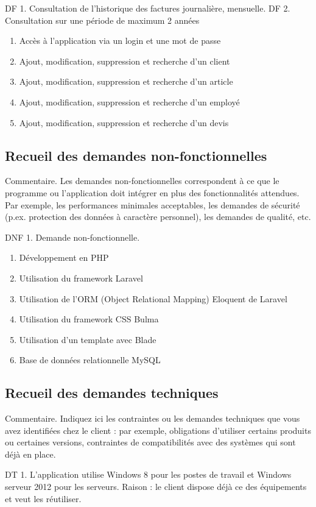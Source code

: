 DF 1.	Consultation de l’historique des factures journalière, mensuelle.  
DF 2.	Consultation sur une période de maximum 2 années

\begin{enumerate} 
\item  Accès à l'application via un login et une mot de passe
\item Ajout, modification, suppression et recherche d’un client
\item Ajout, modification, suppression et recherche d’un article
\item Ajout, modification, suppression et recherche d’un employé
\item Ajout, modification, suppression et recherche d’un devis
\end{enumerate}

\subsection{Recueil des demandes non-fonctionnelles}
Commentaire.  Les demandes non-fonctionnelles correspondent à ce que le programme ou l’application doit intégrer en plus des fonctionnalités attendues.  Par exemple, les performances minimales acceptables, les demandes de sécurité (p.ex. protection des données à caractère personnel), les demandes de qualité, etc.


DNF 1.	Demande non-fonctionnelle.

\begin{enumerate} 
\item Développement en PHP
\item Utilisation du framework Laravel
\item Utilisation de l'ORM (Object Relational Mapping) Eloquent de Laravel
\item Utilisation du framework CSS Bulma
\item Utilisation d'un template avec Blade
\item Base de données relationnelle MySQL

\end{enumerate}

\subsection{Recueil des demandes techniques}
Commentaire.  Indiquez ici les contraintes ou les demandes techniques que vous avez identifiées chez le client : par exemple, obligations d’utiliser certains produits ou certaines versions, contraintes de compatibilités avec des systèmes qui sont déjà en place.


DT 1.	L’application utilise Windows 8 pour les postes de travail et Windows serveur 2012 pour les serveurs.  Raison : le client dispose déjà ce des équipements et veut les réutiliser.
